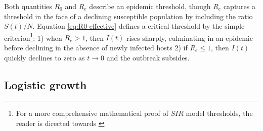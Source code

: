Both quantities $R_0$ and $R_e$ describe an epidemic threshold, though $R_e$ captures a threshold in the face
of a declining susceptible population by including the ratio $S(t)/N$.
Equation \ref{eq:R0-effective} defines a critical threshold by the simple criterion\footnote{
For a more comprehensive mathematical proof of $SIR$
model thresholds, the reader is directed towards \cite{weiss2013sir}}:
1) when $R_e > 1$, then $I(t)$ rises sharply, culminating in an epidemic before declining in the absence of newly
infected hosts
2) if $R_e \leq 1$, then $I(t)$ quickly declines to zero as $t\rightarrow 0$ and the outbreak subsides.


\subsection{Logistic growth}

